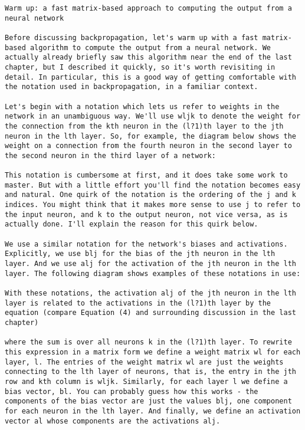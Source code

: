 \begin{lstlisting}
Warm up: a fast matrix-based approach to computing the output from a neural network

Before discussing backpropagation, let's warm up with a fast matrix-based algorithm to compute the output from a neural network. We actually already briefly saw this algorithm near the end of the last chapter, but I described it quickly, so it's worth revisiting in detail. In particular, this is a good way of getting comfortable with the notation used in backpropagation, in a familiar context.

Let's begin with a notation which lets us refer to weights in the network in an unambiguous way. We'll use wljk to denote the weight for the connection from the kth neuron in the (l?1)th layer to the jth neuron in the lth layer. So, for example, the diagram below shows the weight on a connection from the fourth neuron in the second layer to the second neuron in the third layer of a network: 

This notation is cumbersome at first, and it does take some work to master. But with a little effort you'll find the notation becomes easy and natural. One quirk of the notation is the ordering of the j and k indices. You might think that it makes more sense to use j to refer to the input neuron, and k to the output neuron, not vice versa, as is actually done. I'll explain the reason for this quirk below.

We use a similar notation for the network's biases and activations. Explicitly, we use blj for the bias of the jth neuron in the lth layer. And we use alj for the activation of the jth neuron in the lth layer. The following diagram shows examples of these notations in use: 

With these notations, the activation alj of the jth neuron in the lth layer is related to the activations in the (l?1)th layer by the equation (compare Equation (4) and surrounding discussion in the last chapter) 

where the sum is over all neurons k in the (l?1)th layer. To rewrite this expression in a matrix form we define a weight matrix wl for each layer, l. The entries of the weight matrix wl are just the weights connecting to the lth layer of neurons, that is, the entry in the jth row and kth column is wljk. Similarly, for each layer l we define a bias vector, bl. You can probably guess how this works - the components of the bias vector are just the values blj, one component for each neuron in the lth layer. And finally, we define an activation vector al whose components are the activations alj.


\end{lstlisting}
